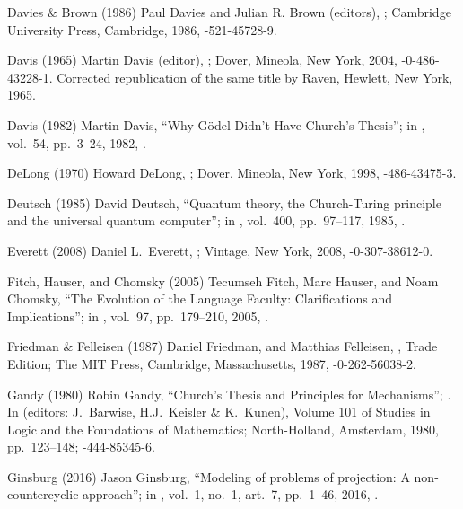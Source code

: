  Davies \& Brown (1986)
Paul Davies and Julian R. Brown (editors),
;
Cambridge University Press, Cambridge, 1986,
-521-45728-9.

 Davis (1965)
Martin Davis (editor),
;
Dover, Mineola, New York, 2004,
-0-486-43228-1.
Corrected republication of the same title
by Raven, Hewlett, New York, 1965.

 Davis (1982)
Martin Davis,
``Why G\"odel Didn't Have Church's Thesis'';
in ,
vol.\ 54, pp.\ 3--24, 1982,
.

 DeLong (1970)
Howard DeLong,
;
Dover, Mineola, New York, 1998,
-486-43475-3.

 Deutsch (1985)
David Deutsch,
``Quantum theory, the Church-Turing principle and
  the universal quantum computer'';
in ,
 vol.\ 400, pp.\ 97--117, 1985,
.

 Everett (2008)
Daniel L.\ Everett,
;
Vintage, New York, 2008,
-0-307-38612-0.

  Fitch, Hauser, and Chomsky (2005)
Tecumseh Fitch, Marc Hauser, and Noam Chomsky,
``The Evolution of the Language Faculty:
Clarifications and Implications'';
in ,
vol.\ 97, pp.\ 179--210, 2005,
.

 Friedman \& Felleisen (1987)
Daniel Friedman, and Matthias Felleisen,
, Trade Edition;
The MIT Press, Cambridge, Massachusetts, 1987,
-0-262-56038-2.

 Gandy (1980)
Robin Gandy,
``Church's Thesis and Principles for Mechanisms'';
.
In 
(editors: J.\ Barwise, H.J.\ Keisler \& K.\ Kunen),
Volume 101 of
Studies in Logic and the Foundations of Mathematics;
North-Holland, Amsterdam, 1980, pp.~123--148;
-444-85345-6.

 Ginsburg (2016)
Jason Ginsburg,
``Modeling of problems of projection:
 A non-counter\-cyclic approach'';
in ,
vol.\ 1, no.\ 1, art.\ 7, pp.\ 1--46, 2016,
.

